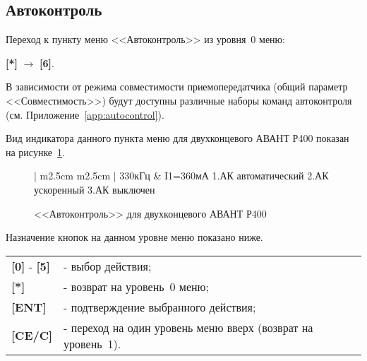 \subsection{Автоконтроль}	\label{ssec:autocontrol}

Переход к пункту меню <<Автоконтроль>> из уровня~0 меню: 

\textbf{[*]} $\rightarrow$ \textbf{[6]}.

В зависимости от режима совместимости приемопередатчика (общий параметр <<Совместимость>>) будут доступны различные наборы команд автоконтроля (см. Приложение~\ref{app:autocontrol}). 


Вид индикатора данного пункта меню для двухконцевого АВАНТ Р400 показан на рисунке~\ref{fig:autocontrol}.
 
\begin{figure}[H]
	\centering
	
	\begin{tabular}{| m{2.5cm}  m{2.5cm} |}
		\firsthline
		330кГц	& \raggedleft I1=360мА				\tabularnewline 
		 {1.АК автоматический}	\tabularnewline 
		 {2.АК ускоренный}		\tabularnewline 
		 {3.АК выключен}	 	\tabularnewline \hline
		\lasthline
	\end{tabular} 
	
	\caption{<<Автоконтроль>> для двухконцевого АВАНТ Р400}
	\label{fig:autocontrol}
\end{figure}

Назначение кнопок на данном уровне меню показано ниже.
\begin{center}
	\begin{tabular}{p{2cm} p{15cm}}
		\textbf{[0]} - \textbf{[5]} & - выбор действия; \tabularnewline 
		\textbf{[*]} 	& - возврат на уровень~0 меню; \tabularnewline
		\textbf{[ENT]} 	& - подтверждение выбранного действия; \tabularnewline
		\textbf{[CE/C]} & - переход на один уровень меню вверх (возврат на уровень~1). \tabularnewline				
	\end{tabular} 
\end{center}